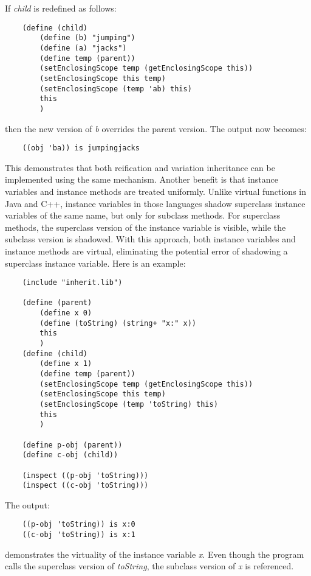 If {\it child} is redefined as follows:

\begin{verbatim}
    (define (child)
        (define (b) "jumping")
        (define (a) "jacks")
        (define temp (parent))
        (setEnclosingScope temp (getEnclosingScope this))
        (setEnclosingScope this temp)
        (setEnclosingScope (temp 'ab) this)
        this
        )
\end{verbatim}

then the new version of {\it b} overrides the parent version.  The output
now becomes:

\begin{verbatim}
    ((obj 'ba)) is jumpingjacks 
\end{verbatim}

This demonstrates that both reification and variation inheritance can be
implemented using the same mechanism.  Another benefit is that instance
variables and instance methods are treated uniformly. Unlike virtual
functions in Java and C++, instance variables in those languages shadow
superclass instance variables of the same name, but only for subclass
methods.  For superclass methods, the superclass version of the instance
variable is visible, while the subclass version is shadowed.  With this
approach, both instance variables and instance methods are virtual,
eliminating the potential error of shadowing a superclass instance
variable. Here is an example:

\begin{verbatim}
    (include "inherit.lib")

    (define (parent)
        (define x 0)
        (define (toString) (string+ "x:" x))
        this
        )
    (define (child)
        (define x 1)
        (define temp (parent))
        (setEnclosingScope temp (getEnclosingScope this))
        (setEnclosingScope this temp)
        (setEnclosingScope (temp 'toString) this)
        this
        )

    (define p-obj (parent))
    (define c-obj (child))

    (inspect ((p-obj 'toString)))
    (inspect ((c-obj 'toString)))
\end{verbatim}

The output:

\begin{verbatim}
    ((p-obj 'toString)) is x:0
    ((c-obj 'toString)) is x:1
\end{verbatim}

demonstrates the virtuality of the instance variable \emph{x}.  Even
though the program calls the superclass version of \emph{toString},
the subclass version of \emph{x} is referenced.

